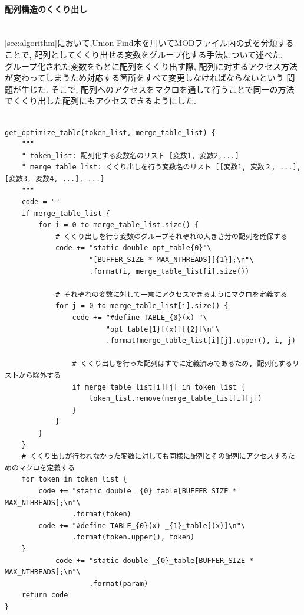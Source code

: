 \paragraph{配列構造のくくり出し}~\\
\ref{sec:algorithm}において,Union-Find木を用いてMODファイル内の式を分類することで,
配列としてくくり出せる変数をグループ化する手法について述べた.\\
グループ化された変数をもとに配列をくくり出す際, 配列に対するアクセス方法が変わってしまうため対応する箇所をすべて変更しなければならないという
問題が生じた. そこで, 配列へのアクセスをマクロを通して行うことで同一の方法でくくり出した配列にもアクセスできるようにした.\\
{\footnotesize
\begin{lstlisting}[caption=計算式内の変数の配列化,label=obtain-vars, frame=single]

get_optimize_table(token_list, merge_table_list) {
    """
    " token_list: 配列化する変数名のリスト [変数1, 変数2,...]
    " merge_table_list: くくり出しを行う変数名のリスト [[変数1, 変数２, ...], [変数3, 変数4, ...], ...]
    """
    code = ""
    if merge_table_list {
        for i = 0 to merge_table_list.size() {
            # くくり出しを行う変数のグループそれぞれの大きさ分の配列を確保する
            code += "static double opt_table{0}"\
                    "[BUFFER_SIZE * MAX_NTHREADS][{1}];\n"\
                    .format(i, merge_table_list[i].size())

            # それぞれの変数に対して一意にアクセスできるようにマクロを定義する
            for j = 0 to merge_table_list[i].size() {
                code += "#define TABLE_{0}(x) "\
                        "opt_table{1}[(x)][{2}]\n"\
                        .format(merge_table_list[i][j].upper(), i, j)

                # くくり出しを行った配列はすでに定義済みであるため, 配列化するリストから除外する
                if merge_table_list[i][j] in token_list {
                    token_list.remove(merge_table_list[i][j])
                }
            }
        }
    }
    # くくり出しが行われなかった変数に対しても同様に配列とその配列にアクセスするためのマクロを定義する
    for token in token_list {
        code += "static double _{0}_table[BUFFER_SIZE * MAX_NTHREADS];\n"\
                .format(token)
        code += "#define TABLE_{0}(x) _{1}_table[(x)]\n"\
                .format(token.upper(), token)
    }
            code += "static double _{0}_table[BUFFER_SIZE * MAX_NTHREADS];\n"\
                    .format(param)
    return code
}


\end{lstlisting}}
